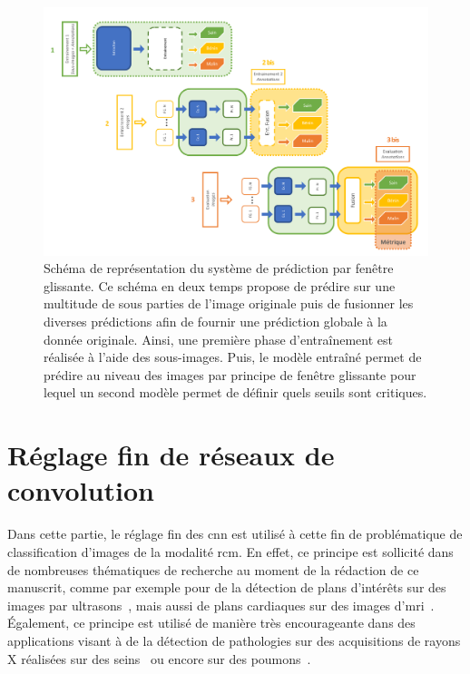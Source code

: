\begin{landscape}
\begin{figure}[H]
    \centering
    \includegraphics[width=0.8\linewidth]{contents/chapter_6/resources/scheme_image_improvement_sliding_features.pdf}
    \caption{Schéma de représentation du système de prédiction par fenêtre glissante. Ce schéma en deux temps propose de prédire sur une multitude de sous parties de l'image originale puis de fusionner les diverses prédictions afin de fournir une prédiction globale à la donnée originale. Ainsi, une première phase d'entraînement est réalisée à l'aide des sous-images. Puis, le modèle entraîné permet de prédire au niveau des images par principe de fenêtre glissante pour lequel un second modèle permet de définir quels seuils sont critiques.}
    \label{fig:scheme_image_improvement_sliding_features}
\end{figure}\par
\end{landscape}

\section{Réglage fin de réseaux de convolution}
Dans cette partie, le réglage fin des \gls{cnn} est utilisé à cette fin de problématique de classification d'images de la modalité \gls{rcm}. En effet, ce principe est sollicité dans de nombreuses thématiques de recherche au moment de la rédaction de ce manuscrit, comme par exemple pour de la détection de plans d'intérêts sur des images par ultrasons~\cite{Chen2015}, mais aussi de plans cardiaques sur des images d'\gls{mri}~\cite{Margeta2017}. Également, ce principe est utilisé de manière très encourageante dans des applications visant à de la détection de pathologies sur des acquisitions de rayons X réalisées sur des seins~\cite{Lotter2017} ou encore sur des poumons~\cite{Gao2018}.\par


